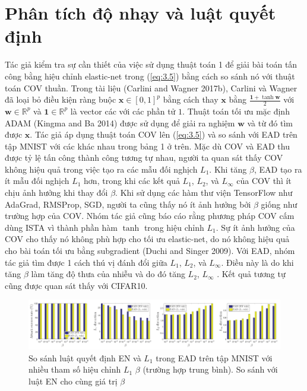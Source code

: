 \section{Phân tích độ nhạy và luật quyết định}
Tác giả kiểm tra sự cần thiết của việc sử dụng thuật toán 1 để giải bài toán tấn công bằng hiệu chỉnh elastic-net trong (\ref{eq:3.5}) bằng cách so sánh nó với thuật toán COV thuần. Trong tài liệu (Carlini and Wagner 2017b), Carlini và Wagner đã loại bỏ điều kiện ràng buộc $\mathbf{x} \in [0,1]^p$ bằng cách thay $\mathbf{x}$ bằng $\frac{\mathbf{1} + \tanh \mathbf{w}}{2}$ với $\mathbf{w} \in \mathbb{R}^p$ và $\mathbf{1} \in \mathbb{R}^p$ là vector các với các phần tử $1$. Thuật toán tối ưu mặc định ADAM (Kingma and Ba 2014) được sử dụng để giải ra nghiệm $\mathbf{w}$ và từ đó tìm được $\mathbf{x}$. Tác giả áp dụng thuật toán COV lên (\ref{eq:3.5}) và so sánh với EAD trên tập MNIST với các  khác nhau trong bảng 1 ở trên. Mặc dù COV và EAD thu được tỷ lệ tấn công thành công tương tự nhau, người ta quan sát thấy COV không hiệu quả trong việc tạo ra các mẫu đối nghịch $L_1$. Khi tăng $\beta$, EAD tạo ra ít mẫu đối nghịch $L_1$ hơn, trong khi các kết quả $L_1$, $L_2$, và $L_{\infty}$ của COV thì ít chịu ảnh hưởng khi thay đổi $\beta$. Khi sử dụng các hàm thư viện TensorFlow như AdaGrad, RMSProp, SGD, người ta cũng thấy nó ít ảnh hưởng bởi $\beta$  giống như trường hợp của COV. Nhóm tác giả cũng báo cáo rằng phương pháp COV cấm dùng ISTA vì thành phần hàm $\tanh$ trong hiệu chỉnh $L_1$. Sự ít ảnh hưởng của COV cho thấy nó không phù hợp cho tối ưu elastic-net, do nó không hiệu quả cho bài toán tối ưu bằng subgradient (Duchi and Singer 2009). Với EAD, nhóm tác giả tìm được 1 cách thú vị đánh đổi giữa $L_1$, $L_2$, và $L_{\infty}$. Điều này là do khi tăng $\beta$ làm tăng độ thưa của nhiễu và do đó tăng $L_2$, $L_{\infty}$ . Kết quả tương tự cũng được quan sát thấy với CIFAR10.
\begin{figure}[H] %
    \centering %
    \includegraphics[width=1\textwidth]{assets/fig_02.png} 
    \caption{So sánh luật quyết định EN và $L_1$ trong EAD trên tập MNIST với nhiều tham số hiệu chỉnh $L_1$ $\beta$ (trường hợp trung bình). So sánh với luật EN cho cùng giá trị $\beta$} %
    \label{fig:fg_02}
\end{figure}

